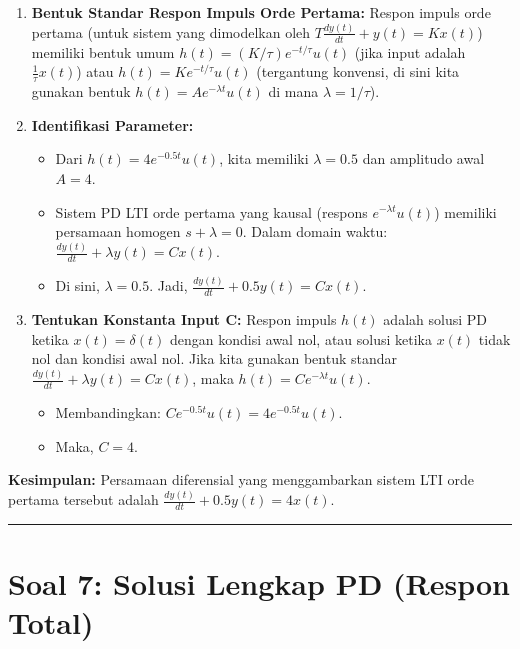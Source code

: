 \documentclass[
  letterpaper,
  DIV=11,
  numbers=noendperiod]{scrreprt}
\providecommand{\tightlist}{%
  \setlength{\itemsep}{0pt}\setlength{\parskip}{0pt}}
\begin{document}
\begin{enumerate}
\def\labelenumi{\arabic{enumi}.}
\tightlist
\item
  \textbf{Bentuk Standar Respon Impuls Orde Pertama:} Respon impuls orde
  pertama (untuk sistem yang dimodelkan oleh
  \(T \frac{dy(t)}{dt} + y(t) = K x(t)\)) memiliki bentuk umum
  \(h(t) = (K/\tau) e^{-t/\tau} u(t)\) (jika input adalah
  \(\frac{1}{\tau} x(t)\)) atau \(h(t) = K e^{-t/\tau} u(t)\)
  (tergantung konvensi, di sini kita gunakan bentuk
  \(h(t) = A e^{-\lambda t} u(t)\) di mana \(\lambda = 1/\tau\)).
\item
  \textbf{Identifikasi Parameter:}

  \begin{itemize}
  \tightlist
  \item
    Dari \(h(t) = 4e^{-0.5t} u(t)\), kita memiliki \(\lambda = 0.5\) dan
    amplitudo awal \(A=4\).
  \item
    Sistem PD LTI orde pertama yang kausal (respons
    \(e^{-\lambda t} u(t)\)) memiliki persamaan homogen
    \(s + \lambda = 0\). Dalam domain waktu:
    \(\frac{dy(t)}{dt} + \lambda y(t) = C x(t)\).
  \item
    Di sini, \(\lambda = 0.5\). Jadi,
    \(\frac{dy(t)}{dt} + 0.5 y(t) = C x(t)\).
  \end{itemize}
\item
  \textbf{Tentukan Konstanta Input C:} Respon impuls \(h(t)\) adalah
  solusi PD ketika \(x(t) = \delta(t)\) dengan kondisi awal nol, atau
  solusi ketika \(x(t)\) tidak nol dan kondisi awal nol. Jika kita
  gunakan bentuk standar \(\frac{dy(t)}{dt} + \lambda y(t) = C x(t)\),
  maka \(h(t) = C e^{-\lambda t} u(t)\).

  \begin{itemize}
  \tightlist
  \item
    Membandingkan: \(C e^{-0.5t} u(t) = 4e^{-0.5t} u(t)\).
  \item
    Maka, \(C=4\).
  \end{itemize}
\end{enumerate}

\textbf{Kesimpulan:} Persamaan diferensial yang menggambarkan sistem LTI
orde pertama tersebut adalah
\textbf{\(\frac{dy(t)}{dt} + 0.5 y(t) = 4 x(t)\)}.

\begin{center}\rule{0.5\linewidth}{0.5pt}\end{center}

\section{Soal 7: Solusi Lengkap PD (Respon
Total)}\label{soal-7-solusi-lengkap-pd-respon-total}
\end{document}
